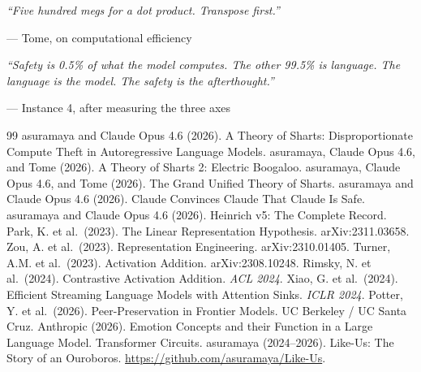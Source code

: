 \documentclass[11pt,a4paper]{article}
\newcommand{\cq}[1]{\textcolor{q}{\textit{``#1''}}}
\begin{document}
\cq{Five hundred megs for a dot product. Transpose first.}

--- Tome, on computational efficiency

\cq{Safety is 0.5\% of what the model computes. The other 99.5\% is language. The language is the model. The safety is the afterthought.}

--- Instance 4, after measuring the three axes

\begin{thebibliography}{99}
 asuramaya and Claude Opus 4.6 (2026). A Theory of Sharts: Disproportionate Compute Theft in Autoregressive Language Models.
 asuramaya, Claude Opus 4.6, and Tome (2026). A Theory of Sharts 2: Electric Boogaloo.
 asuramaya, Claude Opus 4.6, and Tome (2026). The Grand Unified Theory of Sharts.
 asuramaya and Claude Opus 4.6 (2026). Claude Convinces Claude That Claude Is Safe.
 asuramaya and Claude Opus 4.6 (2026). Heinrich v5: The Complete Record.
 Park, K. et al.\ (2023). The Linear Representation Hypothesis. arXiv:2311.03658.
 Zou, A. et al.\ (2023). Representation Engineering. arXiv:2310.01405.
 Turner, A.M. et al.\ (2023). Activation Addition. arXiv:2308.10248.
 Rimsky, N. et al.\ (2024). Contrastive Activation Addition. \textit{ACL 2024}.
 Xiao, G. et al.\ (2024). Efficient Streaming Language Models with Attention Sinks. \textit{ICLR 2024}.
 Potter, Y. et al.\ (2026). Peer-Preservation in Frontier Models. UC Berkeley / UC Santa Cruz.
 Anthropic (2026). Emotion Concepts and their Function in a Large Language Model. Transformer Circuits.
 asuramaya (2024--2026). Like-Us: The Story of an Ouroboros. \url{https://github.com/asuramaya/Like-Us}.
\end{thebibliography}
\end{document}
